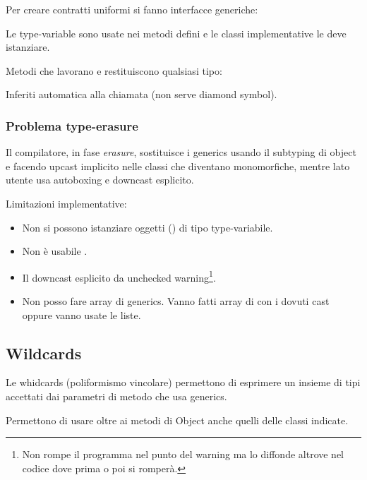 \bigskip

Per creare contratti uniformi si fanno interfacce generiche:


Le type-variable sono usate nei metodi defini e le classi implementative le deve istanziare.

\bigskip

Metodi che lavorano e restituiscono qualsiasi tipo:



Inferiti automatica alla chiamata (non serve diamond symbol).

\subsubsection{Problema type-erasure}
Il compilatore, in fase \textit{erasure}, sostituisce i generics usando il subtyping di object e facendo upcast implicito nelle classi che diventano monomorfiche, mentre lato utente usa autoboxing e downcast esplicito.

Limitazioni implementative:
\begin{itemize}
	\item Non si possono istanziare oggetti () di tipo type-variabile.
	\item Non è usabile .
	\item Il downcast esplicito da unchecked warning\footnote{Non rompe il programma nel punto del warning ma lo diffonde altrove nel codice dove prima o poi si romperà.}.
	\item Non posso fare array di generics. Vanno fatti array di  con i dovuti cast oppure vanno usate le liste.
\end{itemize}

\subsection{Wildcards}
Le whidcards (poliformismo vincolare) permettono di esprimere un insieme di tipi accettati dai parametri di metodo che usa generics.

Permettono di usare oltre ai metodi di Object anche quelli delle classi indicate.


